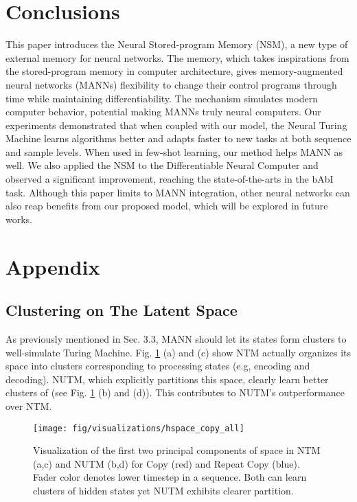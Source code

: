 \documentclass[english]{article}
\begin{document}
\section{Conclusions}

This paper introduces the Neural Stored-program Memory (NSM), a new
type of external memory for neural networks. The memory, which takes
inspirations from the stored-program memory in computer architecture,
gives memory-augmented neural networks (MANNs) flexibility to change
their control programs through time while maintaining differentiability.
The mechanism simulates modern computer behavior, potential making
MANNs truly neural computers. Our experiments demonstrated that when
coupled with our model, the Neural Turing Machine learns algorithms
better and adapts faster to new tasks at both sequence and sample
levels. When used in few-shot learning, our method helps MANN as well.
We also applied the NSM to the Differentiable Neural Computer and
observed a significant improvement, reaching the state-of-the-arts
in the bAbI task. Although this paper limits to MANN integration,
other neural networks can also reap benefits from our proposed model,
which will be explored in future works.
 



\newpage{}

\section*{Appendix}

\renewcommand\thesubsection{\Alph{subsection}}


\subsection{Clustering on The Latent Space\label{subsec:Clustering-on-The}}

As previously mentioned in Sec. 3.3, MANN should let its states form
clusters to well-simulate Turing Machine. Fig. \ref{fig:Visualisation-of-the}
(a) and (c) show NTM actually organizes its  space into clusters
corresponding to processing states (e.g, encoding and decoding). NUTM,
which explicitly partitions this space, clearly learn better clusters
of  (see Fig. \ref{fig:Visualisation-of-the} (b) and (d)).
This contributes to NUTM's outperformance over NTM. 

\begin{figure}[H]
\begin{centering}
\texttt{[image: fig/visualizations/hspace\_copy\_all]}
\par\end{centering}
\caption{Visualization of the first two principal components of  space
in NTM (a,c) and NUTM (b,d) for Copy (red) and Repeat Copy (blue).
Fader color denotes lower timestep in a sequence. Both can learn clusters
of hidden states yet NUTM exhibits clearer partition. \label{fig:Visualisation-of-the} }
\end{figure}
\end{document}
